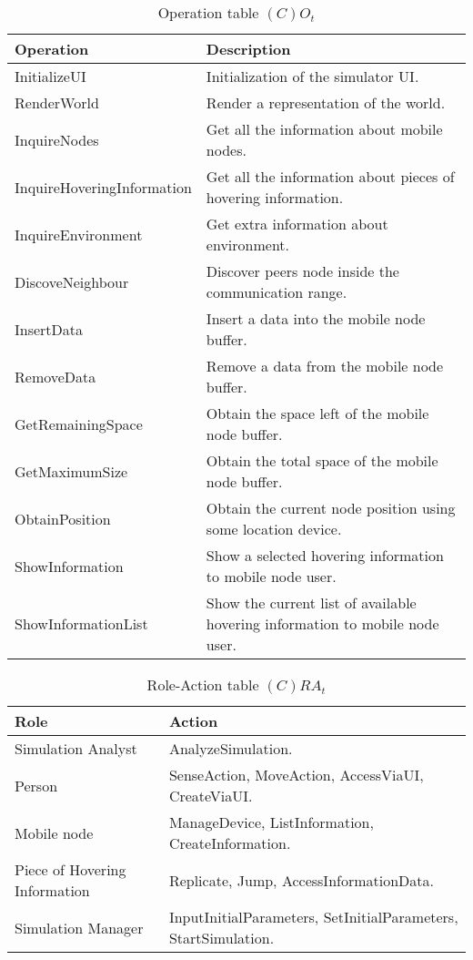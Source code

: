 \begin{table}[H]
	\centering
	\begin{tabular}{|p{5cm}|p{7cm}|}
			\hline
			\textbf{Operation} & \textbf{Description} \\
			\hline
			InitializeUI & Initialization of the simulator UI. \\
			\hline
			RenderWorld & Render a representation of the world. \\
			\hline
			InquireNodes & Get all the information about mobile nodes.\\
			\hline
			InquireHoveringInformation & Get all the information about pieces of
			hovering information.\\
			\hline
			InquireEnvironment & Get extra information about environment.\\
			\hline
			DiscoveNeighbour & Discover peers node inside the communication range. \\
			\hline
			InsertData & Insert a data into the mobile node buffer. \\
			\hline
			RemoveData & Remove a data from the mobile node buffer. \\
			\hline
			GetRemainingSpace & Obtain the space left of the mobile node buffer. \\
			\hline
			GetMaximumSize & Obtain the total space of the mobile node buffer. \\
			\hline
			ObtainPosition & Obtain the current node position using some location
			device. \\
			\hline
			ShowInformation & Show a selected hovering information to mobile node
			user.\\
			\hline
			ShowInformationList & Show the current list of available hovering
			information to mobile node user.\\
			\hline
		\end{tabular}
	\caption{Operation table $(C)O_t$}
	\label{tab:cot}
\end{table}

\begin{table}[H]
	\centering
	\begin{tabular}{|p{4cm}|p{8cm}|}
			\hline
			\textbf{Role} & \textbf{Action} \\
			\hline
			Simulation Analyst & AnalyzeSimulation. \\
			\hline
			Person & SenseAction, MoveAction, AccessViaUI, CreateViaUI. \\
			\hline
			Mobile node & ManageDevice, ListInformation, CreateInformation.  \\
			\hline
			Piece of Hovering Information & Replicate, Jump, AccessInformationData. \\
			\hline
			Simulation Manager & InputInitialParameters, SetInitialParameters,
			StartSimulation. \\
			\hline
		\end{tabular}
	\caption{Role-Action table $(C)RA_t$}
	\label{tab:rat}
\end{table}

